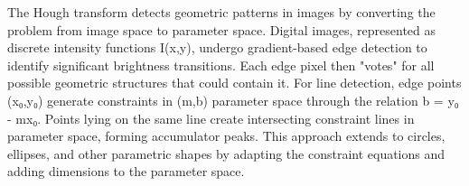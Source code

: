 The Hough transform detects geometric patterns in images by converting the problem from image space to parameter space. Digital images, represented as discrete intensity functions I(x,y), undergo gradient-based edge detection to identify significant brightness transitions. Each edge pixel then "votes" for all possible geometric structures that could contain it. For line detection, edge points (x₀,y₀) generate constraints in (m,b) parameter space through the relation b = y₀ - mx₀. Points lying on the same line create intersecting constraint lines in parameter space, forming accumulator peaks. This approach extends to circles, ellipses, and other parametric shapes by adapting the constraint equations and adding dimensions to the parameter space.